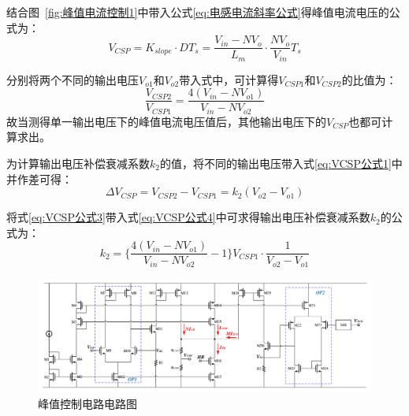 结合图~\ref{fig:峰值电流控制1}中带入公式\eqref{eq:电感电流斜率公式}得峰值电流电压的公式为：
\begin{equation}
    \label{eq:VCSP公式2}
     V_{CSP} = K_{slope} \cdot DT_s = \frac{V_{in} - N V_o}{L_m} \cdot \frac{N V_o}{V_{in}} T_s
\end{equation}

分别将两个不同的输出电压$V_{o1}$和$V_{o2}$带入式中，可计算得$V_{CSP1}$和$V_{CSP2}$的比值为：
\begin{equation}
    \label{eq:VCSP公式3}
    \frac{V_{CSP2}}{V_{CSP1}} = \frac{4 (V_{in} - NV_{o1})}{V_{in} - NV_{o2}}
\end{equation}
故当测得单一输出电压下的峰值电流电压值后，其他输出电压下的$V_{CSP}$也都可计算求出。

为计算输出电压补偿衰减系数$k_2$的值，将不同的输出电压带入式\eqref{eq:VCSP公式1}中并作差可得：
\begin{equation}
    \label{eq:VCSP公式4}
    \varDelta V_{CSP} = V_{CSP2}-V_{CSP1} = k_2 (V_{o2} - V_{o1})
\end{equation}

将式\eqref{eq:VCSP公式3}带入式\eqref{eq:VCSP公式4}中可求得输出电压补偿衰减系数$k_2$的公式为：
\begin{equation}
    \label{eq:k2公式}
    k_2 = \{ \frac{4 (V_{in} - NV_{o1})}{V_{in} - NV_{o2}} - 1 \} V_{CSP1} \cdot \frac{1}{V_{o2} - V_{o1}}
\end{equation}

\begin{figure}[htbp] 
    \centering
    \includegraphics[width=1.0\linewidth]{figures/峰值控制电路图.pdf}
    \caption{峰值控制电路电路图}
    \label{fig:峰值控制电路图}
\end{figure}

